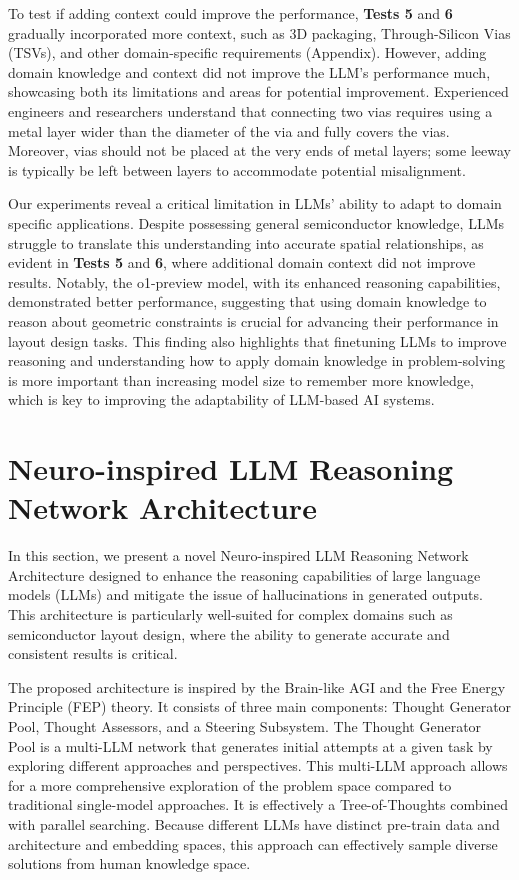 \documentclass{article}
\begin{document}
To test if adding context could improve the performance, \textbf{Tests 5} and \textbf{6} gradually incorporated more context, such as 3D packaging, Through-Silicon Vias (TSVs), and other domain-specific requirements (Appendix). However, adding domain knowledge and context did not improve the LLM's performance much, showcasing both its limitations and areas for potential improvement. Experienced engineers and researchers understand that connecting two vias requires using a metal layer wider than the diameter of the via and fully covers the vias. Moreover, vias should not be placed at the very ends of metal layers; some leeway is typically be left between layers to accommodate potential misalignment. %

Our experiments reveal a critical limitation in LLMs' ability to adapt to domain specific applications. Despite possessing general semiconductor knowledge, LLMs struggle to translate this understanding into accurate spatial relationships, as evident in \textbf{Tests 5} and\textbf{ 6}, where additional domain context did not improve results. Notably, the o1-preview model, with its enhanced reasoning capabilities, demonstrated better performance, suggesting that using domain knowledge to reason about geometric constraints is crucial for advancing their performance in layout design tasks. This finding also highlights that finetuning LLMs to improve reasoning and understanding how to apply domain knowledge in problem-solving is more important than increasing model size to remember more knowledge, which is key to improving the adaptability of LLM-based AI systems.

\section{Neuro-inspired LLM Reasoning Network Architecture}

In this section, we present a novel Neuro-inspired LLM Reasoning Network Architecture designed to enhance the reasoning capabilities of large language models (LLMs) and mitigate the issue of hallucinations in generated outputs. This architecture is particularly well-suited for complex domains such as semiconductor layout design, where the ability to generate accurate and consistent results is critical.

The proposed architecture is inspired by the Brain-like AGI and the Free Energy Principle (FEP) theory. It consists of three main components: Thought Generator Pool, Thought Assessors, and a Steering Subsystem. The Thought Generator Pool is a multi-LLM network that generates initial attempts at a given task by exploring different approaches and perspectives. This multi-LLM approach allows for a more comprehensive exploration of the problem space compared to traditional single-model approaches. It is effectively a Tree-of-Thoughts combined with parallel searching. Because different LLMs have distinct pre-train data and architecture and embedding spaces, this approach can effectively sample diverse solutions from human knowledge space.
\end{document}
